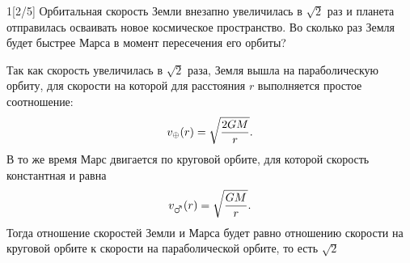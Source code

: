 

\begin{task}{1}[2/5]
    Орбитальная скорость Земли внезапно увеличилась в $\sqrt{2}$ раз и планета отправилась осваивать новое космическое пространство. Во сколько раз Земля будет быстрее Марса в момент пересечения его орбиты?
\end{task}



\begin{solution}
    Так как скорость увеличилась в $\sqrt{2}$ раза, Земля вышла на параболическую орбиту, для скорости на которой для расстояния $r$ выполняется простое соотношение:
    $$
    v_{\oplus}(r) = \sqrt{\frac{2GM}{r}}.
    $$
    В то же время Марс двигается по круговой орбите, для которой скорость константная и равна
    $$
    v_{\mars}(r) = \sqrt{\frac{GM}{r}}.
    $$
    Тогда отношение скоростей Земли и Марса будет равно отношению скорости на круговой орбите к скорости на параболической орбите, то есть $\sqrt{2}$
\end{solution}
